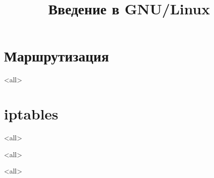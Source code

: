 

\title{Введение в GNU/Linux}








\begin{frame}
	\frametitle{}
	\titlepage
	\vspace{-0.5cm}
	\begin{center}
	\end{center}
\end{frame}



\section{Маршрутизация}
\mode<all>{}

\section{iptables}
\mode<all>{}

\mode<all>{}

\mode<all>

